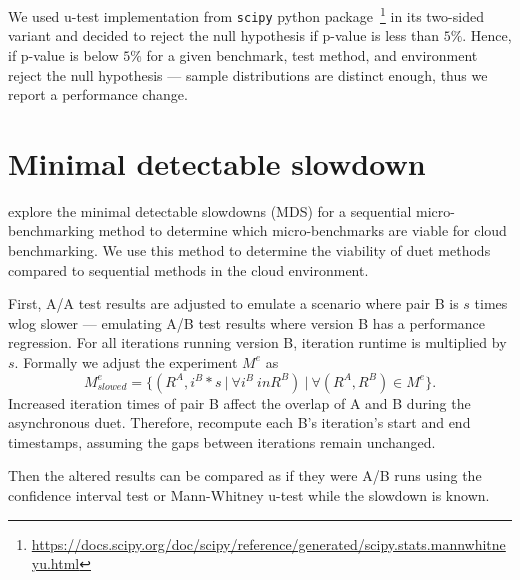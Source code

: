 We used \mbox{u-test} implementation from \lstinline{scipy} python package~\footnote{\url{https://docs.scipy.org/doc/scipy/reference/generated/scipy.stats.mannwhitneyu.html}} in its \mbox{two-sided} variant and decided to reject the null hypothesis if \mbox{p-value} is less than $5\%$.
Hence, if \mbox{p-value} is below $5\%$ for a given benchmark, test method, and environment reject the null hypothesis --- sample distributions are distinct enough, thus we report a performance change.

\section{Minimal detectable slowdown}
\label{sec:mds}

 explore the minimal detectable slowdowns (MDS) for a sequential micro-benchmarking method to determine which micro-benchmarks are viable for cloud benchmarking.
We use this method to determine the viability of duet methods compared to sequential methods in the cloud environment.

First, A/A test results are adjusted to emulate a scenario where pair B is $s$ times wlog slower --- emulating A/B test results where version B has a performance regression.
For all iterations running version B, iteration runtime is multiplied by $s$.
Formally we adjust the experiment $M^{e}$ as
$$
M^{e}_{slowed} = \{(R^A, {i^B * s~|~\forall i^B \ in R^B})~|~\forall (R^A, R^B) \in M^{e}\}.
$$
Increased iteration times of pair B affect the overlap of A and B during the asynchronous duet.
Therefore, recompute each B's iteration's start and end timestamps, assuming the gaps between iterations remain unchanged.

Then the altered results can be compared as if they were A/B runs using the confidence interval test or \mbox{Mann-Whitney} \mbox{u-test} while the slowdown is known.
